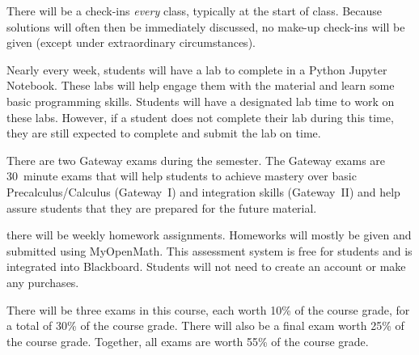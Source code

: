\documentclass[11pt,letterpaper]{article}
\begin{document}
There will be a check-ins \textit{every} class, typically at the start of class. Because solutions will often then be immediately discussed, no make-up check-ins will be given (except under extraordinary circumstances). \pspace


Nearly every week, students will have a lab to complete in a Python Jupyter Notebook. These labs will help engage them with the material and learn some basic programming skills. Students will have a designated lab time to work on these labs. However, if a student does not complete their lab during this time, they are still expected to complete and submit the lab on time.
\pspace


There are two Gateway exams during the semester. The Gateway exams are 30~minute exams that will help students to achieve mastery over basic Precalculus/Calculus (Gateway~I) and integration skills (Gateway~II) and help assure students that they are prepared for the future material. 
\pspace



\newpage



there will be weekly homework assignments. Homeworks will mostly be given and submitted using MyOpenMath. This assessment system is free for students and is integrated into Blackboard. Students will not need to create an account or make any purchases. 
\pspace


There will be three exams in this course, each worth 10\% of the course grade, for a total of 30\% of the course grade. There will also be a final exam worth 25\% of the course grade. Together, all exams are worth 55\% of the course grade. 
\pspace
\end{document}
